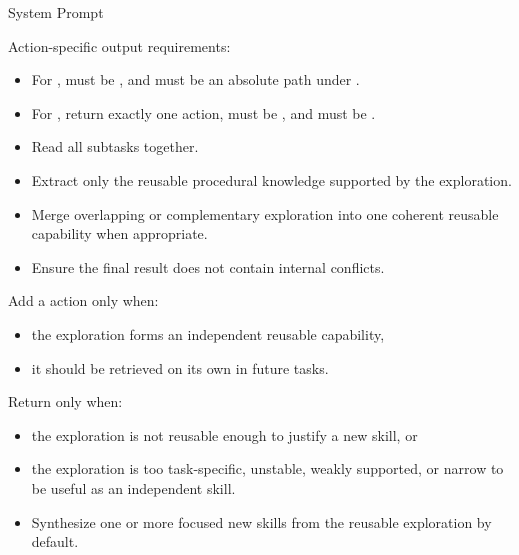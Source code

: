 \begin{svpromptbox}{System Prompt}
\begin{itemize}
\end{itemize}
\smallskip
Action-specific output requirements:\par
\smallskip
\begin{itemize}
\item For ,  must be , and  must be an absolute path under .
\item For , return exactly one action,  must be , and  must be .
\end{itemize}
\smallskip
{}
\smallskip
{}
\begin{itemize}
\item Read all subtasks together.
\item Extract only the reusable procedural knowledge supported by the exploration.
\item Merge overlapping or complementary exploration into one coherent reusable capability when appropriate.
\item Ensure the final result does not contain internal conflicts.
\end{itemize}
\smallskip
{}
Add a  action only when:\par
\begin{itemize}
\item the exploration forms an independent reusable capability,
\item it should be retrieved on its own in future tasks.
\end{itemize}
\smallskip
Return  only when:\par
\begin{itemize}
\item the exploration is not reusable enough to justify a new skill, or
\item the exploration is too task-specific, unstable, weakly supported, or narrow to be useful as an independent skill.
\end{itemize}
\smallskip
{}
\begin{itemize}
\item Synthesize one or more focused new skills from the reusable exploration by default.

\end{itemize}
\end{svpromptbox}
